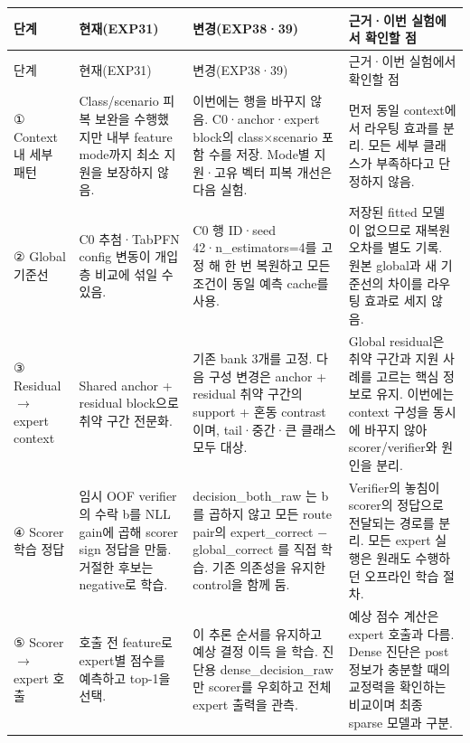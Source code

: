 \begingroup
\footnotesize
\begin{longtable}{>{\raggedright\arraybackslash}p{}>{\raggedright\arraybackslash}p{}>{\raggedright\arraybackslash}p{}>{\raggedright\arraybackslash}p{}}
\toprule
단계 & 현재(EXP31) & 변경(EXP38·39) & 근거·이번 실험에서 확인할 점 \\ \midrule
\endfirsthead
단계 & 현재(EXP31) & 변경(EXP38·39) & 근거·이번 실험에서 확인할 점 \\ \midrule
\endhead
{}① Context 내 세부 패턴 & Class/\allowbreak{}scenario 피복 보완을 수행했지만 내부 feature mode까지 최소 지원을 보장하지 않음. & 이번에는 행을 바꾸지 않음. C0·anchor·expert block의 class×scenario 포함 수를 저장. Mode별 지원·고유 벡터 피복 개선은 다음 실험. & 먼저 동일 context에서 라우팅 효과를 분리. 모든 세부 클래스가 부족하다고 단정하지 않음. \\
{}② Global 기준선 & C0 추첨·TabPFN config 변동이 개입층 비교에 섞일 수 있음. & C0 행 ID·seed 42·n\_\allowbreak{}estimators=\allowbreak{}4를 고정 해 한 번 복원하고 모든 조건이 동일 예측 cache를 사용. & 저장된 fitted 모델이 없으므로 재복원 오차를 별도 기록. 원본 global과 새 기준선의 차이를 라우팅 효과로 세지 않음. \\
{}③ Residual  \ensuremath{\rightarrow}  expert context & Shared anchor +\allowbreak{} residual block으로 취약 구간 전문화. & 기존 bank 3개를 고정. 다음 구성 변경은 anchor +\allowbreak{} residual 취약 구간의 support +\allowbreak{} 혼동 contrast 이며, tail·중간·큰 클래스 모두 대상. & Global residual은 취약 구간과 지원 사례를 고르는 핵심 정보로 유지. 이번에는 context 구성을 동시에 바꾸지 않아 scorer/\allowbreak{}verifier와 원인을 분리. \\
{}④ Scorer 학습 정답 & 임시 OOF verifier의 수락 b를 NLL gain에 곱해 scorer sign 정답을 만듦. 거절한 후보는 negative로 학습. & decision\_\allowbreak{}both\_\allowbreak{}raw 는 b를 곱하지 않고 모든 route pair의 expert\_\allowbreak{}correct − global\_\allowbreak{}correct 를 직접 학습. 기존 의존성을 유지한 control을 함께 둠. & Verifier의 놓침이 scorer의 정답으로 전달되는 경로를 분리. 모든 expert 실행은 원래도 수행하던 오프라인 학습 절차. \\
{}⑤ Scorer  \ensuremath{\rightarrow}  expert 호출 & 호출 전 feature로 expert별 점수를 예측하고 top-1을 선택. & 이 추론 순서를 유지하고 예상 결정 이득 을 학습. 진단용 dense\_\allowbreak{}decision\_\allowbreak{}raw 만 scorer를 우회하고 전체 expert 출력을 관측. & 예상 점수 계산은 expert 호출과 다름. Dense 진단은 post 정보가 충분할 때의 교정력을 확인하는 비교이며 최종 sparse 모델과 구분. \\

\end{longtable}

